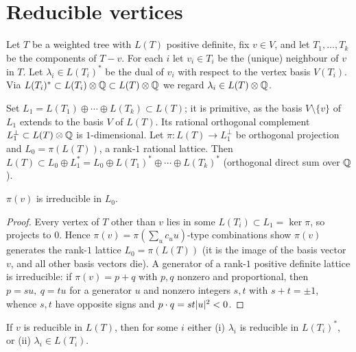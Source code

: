\section{Reducible vertices}
\label{sec:reducible}

Let $T$ be a weighted tree with $L(T)$ positive definite, fix $v\in V$, and let
$T_1,\dots,T_k$ be the components of $T-v$.  For each $i$ let $v_i\in T_i$ be the (unique)
neighbour of $v$ in $T$.  Let $\lambda_i\in L(T_i)^\ast$ be the dual of $v_i$ with respect to
the vertex basis $V(T_i)$.  Via $L(T_i)^\ast\subset L(T_i)\otimes\mathbb{Q}\subset L(T)\otimes\mathbb{Q}$
we regard $\lambda_i\in L(T)\otimes\mathbb{Q}$.

Set $L_1=L(T_1)\oplus\cdots\oplus L(T_k)\subset L(T)$; it is primitive, as the basis
$V\setminus\{v\}$ of $L_1$ extends to the basis $V$ of $L(T)$.  Its rational orthogonal
complement $L_1^\perp\subset L(T)\otimes\mathbb{Q}$ is $1$-dimensional.  Let
$\pi:L(T)\to L_1^\perp$ be orthogonal projection and $L_0=\pi(L(T))$, a rank-$1$ rational
lattice.  Then $L(T)\subset L_0\oplus L_1^\ast=L_0\oplus L(T_1)^\ast\oplus\cdots\oplus
L(T_k)^\ast$ (orthogonal direct sum over $\mathbb{Q}$).

\begin{lem}
\label{lem:irred}
$\pi(v)$ is irreducible in $L_0$.
\end{lem}

\begin{proof}
Every vertex of $T$ other than $v$ lies in some $L(T_i)\subset L_1=\ker\pi$, so projects to
$0$.  Hence $\pi(v)=\pi(\sum_{u}c_uu)$-type combinations show $\pi(v)$ generates the rank-$1$
lattice $L_0=\pi(L(T))$ (it is the image of the basis vector $v$, and all other basis vectors
die).  A generator of a rank-$1$ positive definite lattice is irreducible: if
$\pi(v)=p+q$ with $p,q$ nonzero and proportional, then $p=su,\ q=tu$ for a generator $u$ and
nonzero integers $s,t$ with $s+t=\pm1$, whence $s,t$ have opposite signs and
$p\cdot q=st\lvert u\rvert^{2}<0$.
\end{proof}

\begin{lem}
\label{lem:dichotomy}
If $v$ is reducible in $L(T)$, then for some $i$ either
\textup{(i)} $\lambda_i$ is reducible in $L(T_i)^\ast$, or \textup{(ii)} $\lambda_i\in L(T_i)$.
\end{lem}


